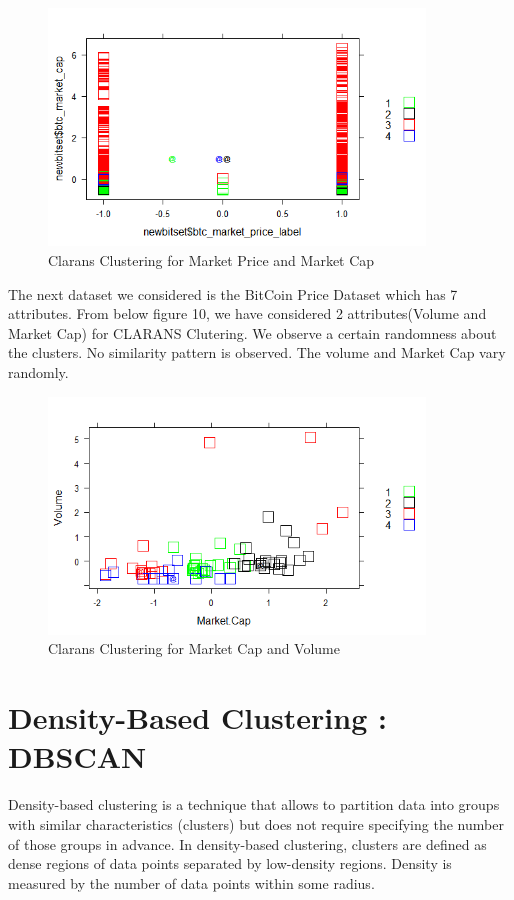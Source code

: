 \documentclass{article}
\begin{document}
\begin{figure}[h]
    \centering
    \includegraphics[width=10cm]{CLaransClusteringFig3.png}
    \caption{Clarans Clustering for Market Price and Market Cap }
    \label{fig:my_label}
\end{figure}

The next dataset we considered is the BitCoin Price Dataset which has 7 attributes. From below figure 10, we have considered 2 attributes(Volume and Market Cap) for CLARANS Clutering. We observe a certain randomness about the clusters. No similarity pattern is observed. The volume and Market Cap vary randomly.

\begin{figure}[h]
    \centering
    \includegraphics[width=10cm]{CLARANSMARCAPVOLFig4.png}
    \caption{Clarans Clustering for Market Cap and Volume }
    \label{fig:my_label}
\end{figure}

\newpage
\section{Density-Based Clustering : DBSCAN}
Density-based clustering is a technique that allows to partition data into groups with similar characteristics (clusters) but does not require specifying the number of those groups in advance. In density-based clustering, clusters are defined as dense regions of data points separated by low-density regions. Density is measured by the number of data points within some radius.\newline
\end{document}
